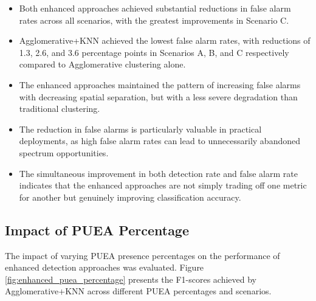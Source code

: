\begin{itemize}
    \item Both enhanced approaches achieved substantial reductions in false alarm rates across all scenarios, with the greatest improvements in Scenario C.
    
    \item Agglomerative+KNN achieved the lowest false alarm rates, with reductions of 1.3, 2.6, and 3.6 percentage points in Scenarios A, B, and C respectively compared to Agglomerative clustering alone.
    
    \item The enhanced approaches maintained the pattern of increasing false alarms with decreasing spatial separation, but with a less severe degradation than traditional clustering.
    
    \item The reduction in false alarms is particularly valuable in practical deployments, as high false alarm rates can lead to unnecessarily abandoned spectrum opportunities.
    
    \item The simultaneous improvement in both detection rate and false alarm rate indicates that the enhanced approaches are not simply trading off one metric for another but genuinely improving classification accuracy.
\end{itemize}

\subsection{Impact of PUEA Percentage}

The impact of varying PUEA presence percentages on the performance of enhanced detection approaches was evaluated. Figure \ref{fig:enhanced_puea_percentage} presents the F1-scores achieved by Agglomerative+KNN across different PUEA percentages and scenarios.


